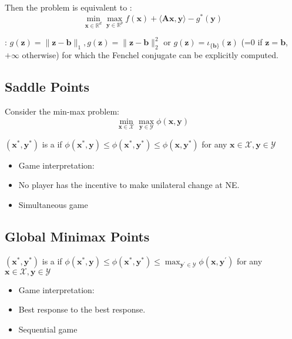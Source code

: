 Then the problem is equivalent to :
$$
\min _{\mathbf{x} \in \mathbb{R}^{d}} \max _{\mathbf{y} \in \mathbb{R}^{p}} f(\mathbf{x})+\langle\mathbf{A} \mathbf{x}, \mathbf{y}\rangle-g^{*}(\mathbf{y})
$$

: $g(\mathbf{z})=\|\mathbf{z}-\mathbf{b}\|_{1}, g(\mathbf{z})=\|\mathbf{z}-\mathbf{b}\|_{2}^{2}$ or $g(\mathbf{z})=\iota_{\{\mathbf{b}\}}(\mathbf{z})$ (=0 if $\mathbf{z}=\mathbf{b}$, $+\infty$ otherwise) for which the Fenchel conjugate can be explicitly computed.



\subsection*{Saddle Points}
Consider the min-max problem:
$$\min _{\mathbf{x} \in \mathcal{X}} \max _{\mathbf{y} \in \mathcal{Y}} \phi(\mathbf{x}, \mathbf{y})$$


$\left(\mathbf{x}^{*}, \mathbf{y}^{*}\right)$ is a  if $\phi\left(\mathbf{x}^{*}, \mathbf{y}\right) \leq \phi\left(\mathbf{x}^{*}, \mathbf{y}^{*}\right) \leq \phi\left(\mathbf{x}, \mathbf{y}^{*}\right)$ for any $\mathbf{x} \in \mathcal{X}, \mathbf{y} \in \mathcal{Y}$
\begin{itemize}[leftmargin=*]
    \item Game interpretation: 
    \item No player has the incentive to make unilateral change at NE.
    \item Simultaneous game
\end{itemize}





\subsection*{Global Minimax Points}
$\left(\mathbf{x}^{*}, \mathbf{y}^{*}\right)$ is a  if $\phi\left(\mathbf{x}^{*}, \mathbf{y}\right) \leq \phi\left(\mathbf{x}^{*}, \mathbf{y}^{*}\right) \leq \max _{\mathbf{y}^{\prime} \in \mathcal{Y}} \phi\left(\mathbf{x}, \mathbf{y}^{\prime}\right)$
for any $\mathbf{x} \in \mathcal{X}, \mathbf{y} \in \mathcal{Y}$
\begin{itemize}[leftmargin=*]
    \item Game interpretation: 
    \item Best response to the best response.
    \item Sequential game
\end{itemize}





